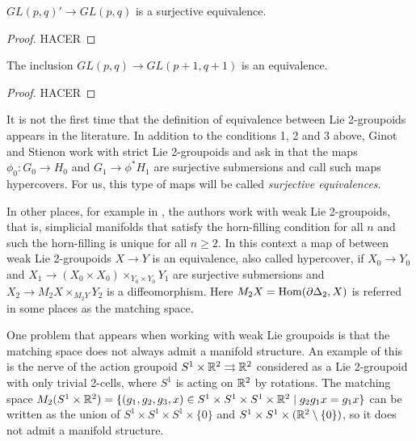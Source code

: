 \begin{lemma}
$GL(p,q)' \to GL(p,q)$ is a surjective equivalence.
\end{lemma}

\begin{proof}
HACER
\end{proof}

\begin{lemma}
The inclusion $GL(p,q) \to GL(p+1,q+1)$ is an equivalence.
\end{lemma}

\begin{proof}
HACER
\end{proof}

\medskip

It is not the first time that the definition of equivalence between Lie 2-groupoids appears in the literature.
In addition to the conditions 1, 2 and 3 above, Ginot and Stienon work with strict Lie 2-groupoids and ask in \cite{gs} that the maps $\phi_0: G_0\to H_0$ and $G_1 \to \phi^*H_1$ are surjective submersions and call such maps hypercovers.
For us, this type of maps will be called \emph{surjective equivalences}.

In other places, for example in \cite{z}, the authors work with weak Lie 2-groupoids, that is, simplicial manifolds that satisfy the horn-filling condition for all $n$ and such the horn-filling is unique for all $n\geq 2$.
In this context a map of between weak Lie 2-groupoids $X\to Y$ is an equivalence, also called hypercover, if $X_0\to Y_0$ and $X_1\to (X_0\times X_0)\times_{Y_0\times Y_0} Y_1$ are surjective submersions and $X_2\to M_2X\times_{M_2Y} Y_2$ is a diffeomorphism.
Here $M_2X = \operatorname{Hom}(\partial\Delta_2, X)$ is referred in some places as the matching space.

One problem that appears when working with weak Lie groupoids is that the matching space does not always admit a manifold structure.
An example of this is the nerve of the action groupoid $S^1\times\mathbb{R}^2 \rightrightarrows \mathbb{R}^2$ considered as a Lie 2-groupoid with only trivial 2-cells, where $S^1$ is acting on $\mathbb{R}^2$ by rotations.
The matching space
$ M_2(S^1\times\mathbb{R}^2) = \{ (g_1,g_2,g_3,x)\in S^1\times S^1\times S^1\times\mathbb{R}^2 \mid g_2g_1 x = g_1 x \} $
can be written as the union of $S^1\times S^1\times S^1\times \{0\}$ and $S^1\times S^1\times (\mathbb{R}^2\setminus \{0\})$, so it does not admit a manifold structure.


